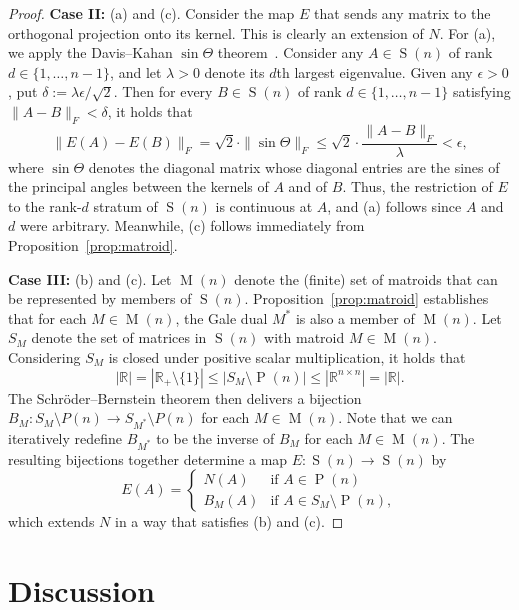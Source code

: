 \documentclass[12pt]{article}
\theoremstyle{plain}
\theoremstyle{definition}
\theoremstyle{remark}
\newcommand{\oP}{\operatorname{P}}
\newcommand{\oS}{\operatorname{S}}
\newcommand{\oM}{\operatorname{M}}
\begin{document}
\begin{proof}
\medskip
\noindent
\textbf{Case II:} (a) and (c).
Consider the map $E$ that sends any matrix to the orthogonal projection onto its kernel.
This is clearly an extension of $N$.
For (a), we apply the Davis--Kahan $\sin\Theta$ theorem~\cite{DavisK:70}.
Consider any $A\in\oS(n)$ of rank $d\in\{1,\ldots,n-1\}$, and let $\lambda>0$ denote its $d$th largest eigenvalue.
Given any $\epsilon>0$, put $\delta:=\lambda\epsilon/\sqrt{2}$.
Then for every $B\in\oS(n)$ of rank $d\in\{1,\ldots,n-1\}$ satisfying $\|A-B\|_F<\delta$, it holds that
\[
\|E(A)-E(B)\|_F
=\sqrt{2}\cdot\|\sin\Theta\|_F
\leq\sqrt{2}\cdot\frac{\|A-B\|_F}{\lambda}
<\epsilon,
\]
where $\sin\Theta$ denotes the diagonal matrix whose diagonal entries are the sines of the principal angles between the kernels of $A$ and of $B$.
Thus, the restriction of $E$ to the rank-$d$ stratum of $\oS(n)$ is continuous at $A$, and (a) follows since $A$ and $d$ were arbitrary.
Meanwhile, (c) follows immediately from Proposition~\ref{prop:matroid}.

\medskip
\noindent
\textbf{Case III:} (b) and (c).
Let $\oM(n)$ denote the (finite) set of matroids that can be represented by members of $\oS(n)$.
Proposition~\ref{prop:matroid} establishes that for each $M\in\oM(n)$, the Gale dual $M^*$ is also a member of $\oM(n)$. 
Let $S_M$ denote the set of matrices in $\oS(n)$ with matroid $M\in\oM(n)$.
Considering $S_M$ is closed under positive scalar multiplication, it holds that
\[
|\mathbb{R}|
=|\mathbb{R}_+\setminus\{1\}|
\leq|S_M\setminus\oP(n)|
\leq|\mathbb{R}^{n\times n}|
=|\mathbb{R}|.
\]
The Schr\"{o}der--Bernstein theorem then delivers a bijection $B_M\colon S_M\setminus{P}(n)\to S_{M^*}\setminus{P}(n)$ for each $M\in\oM(n)$.
Note that we can iteratively redefine $B_{M^*}$ to be the inverse of $B_M$ for each $M\in\oM(n)$.
The resulting bijections together determine a map $E\colon\oS(n)\to\oS(n)$ by
\[
E(A)
=\left\{\begin{array}{rl} N(A)&\text{if }A\in\oP(n)\\
B_M(A)&\text{if }A\in S_M\setminus\oP(n),
\end{array}\right.
\]
which extends $N$ in a way that satisfies (b) and (c).
\end{proof}

\section{Discussion}
\end{document}
